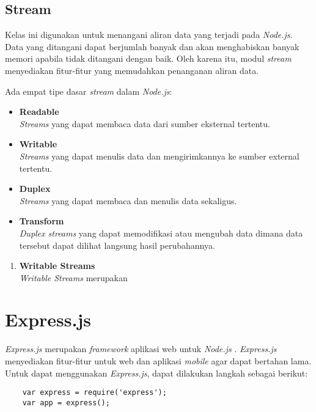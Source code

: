 \subsection{Stream}
Kelas ini digunakan untuk menangani aliran data yang terjadi pada \textit{Node.js}. Data yang ditangani dapat berjumlah banyak dan akan menghabiskan banyak memori apabila tidak ditangani dengan baik. Oleh karena itu, modul \textit{stream} menyediakan fitur-fitur yang memudahkan penanganan aliran data.

Ada empat tipe dasar \textit{stream} dalam \textit{Node.js}:
\begin{itemize}
	\item \textbf{Readable} \\ \textit{Streams} yang dapat membaca data dari sumber eksternal tertentu.
	\item \textbf{Writable} \\ \textit{Streams} yang dapat menulis data dan mengirimkannya ke sumber external tertentu.
	\item \textbf{Duplex} \\ \textit{Streams} yang dapat membaca dan menulis data sekaligus.
	\item \textbf{Transform} \\ \textit{Duplex streams} yang dapat memodifikasi atau mengubah data dimana data tersebut dapat dilihat langsung hasil perubahannya.
\end{itemize}

\begin{enumerate}
	\item \textbf{Writable Streams} \\ 
	\textit{Writable Streams} merupakan 
\end{enumerate}


\section{Express.js}
\label{sec:Express.js}

\textit{Express.js} merupakan \textit{framework} aplikasi web untuk \textit{Node.js} \cite{expressjs}. \textit{Express.js} menyediakan fitur-fitur untuk web dan aplikasi \textit{mobile} agar dapat bertahan lama. Untuk dapat menggunakan \textit{Express.js}, dapat dilakukan langkah sebagai berikut: 
\begin{lstlisting}
	var express = require('express');
	var app = express();
\end{lstlisting}

